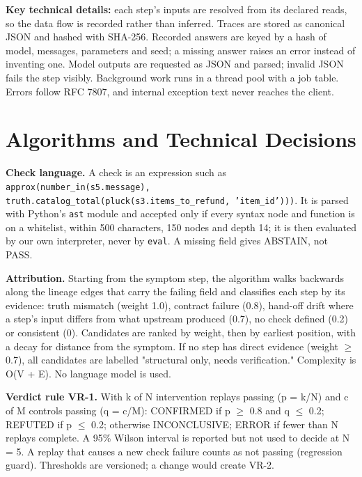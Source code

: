 \textbf{Key technical details:} each step's inputs are resolved from its declared reads, so the data flow is recorded rather than inferred. Traces are stored as canonical JSON and hashed with SHA-256. Recorded answers are keyed by a hash of model, messages, parameters and seed; a missing answer raises an error instead of inventing one. Model outputs are requested as JSON and parsed; invalid JSON fails the step visibly. Background work runs in a thread pool with a job table. Errors follow RFC 7807, and internal exception text never reaches the client.

\section{Algorithms and Technical Decisions}

\textbf{Check language.} A check is an expression such as \texttt{approx(\allowbreak{}number\_\allowbreak{}in(\allowbreak{}s5.\allowbreak{}message),\allowbreak{} truth.\allowbreak{}catalog\_\allowbreak{}total(\allowbreak{}pluck(\allowbreak{}s3.\allowbreak{}items\_\allowbreak{}to\_\allowbreak{}refund,\allowbreak{} 'item\_\allowbreak{}id')))}. It is parsed with Python's \texttt{ast} module and accepted only if every syntax node and function is on a whitelist, within 500 characters, 150 nodes and depth 14; it is then evaluated by our own interpreter, never by \texttt{eval}. A missing field gives ABSTAIN, not PASS.

\textbf{Attribution.} Starting from the symptom step, the algorithm walks backwards along the lineage edges that carry the failing field and classifies each step by its evidence: truth mismatch (weight 1.0), contract failure (0.8), hand-off drift where a step's input differs from what upstream produced (0.7), no check defined (0.2) or consistent (0). Candidates are ranked by weight, then by earliest position, with a decay for distance from the symptom. If no step has direct evidence (weight $\geq$ 0.7), all candidates are labelled "structural only, needs verification." Complexity is O(V + E). No language model is used.

\textbf{Verdict rule VR-1.} With k of N intervention replays passing (p = k/N) and c of M controls passing (q = c/M): CONFIRMED if p $\geq$ 0.8 and q $\leq$ 0.2; REFUTED if p $\leq$ 0.2; otherwise INCONCLUSIVE; ERROR if fewer than N replays complete. A 95\% Wilson interval is reported but not used to decide at N = 5. A replay that causes a new check failure counts as not passing (regression guard). Thresholds are versioned; a change would create VR-2.

